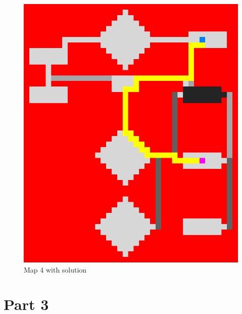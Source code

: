 \documentclass{article}
\begin{document}
\begin{figure}[h]
\begin{minipage}{0.4\textwidth}
		\includegraphics[width=\textwidth]{images/map4_solution}
    		\caption{Map 4 with solution}
	\end{minipage}
\end{figure}

\newpage
\section{Part 3}
\end{document}
